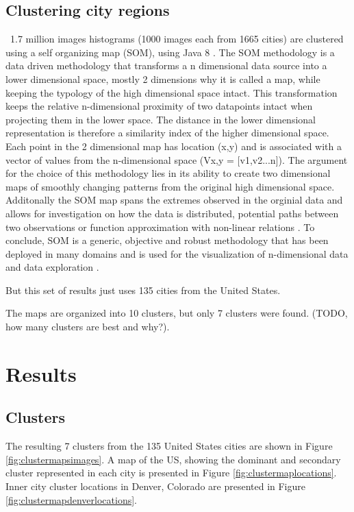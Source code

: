 \documentclass[final,3p,times,authoryear]{elsarticle}
\begin{document}
\subsection{Clustering city regions}\label{methodscluster}
~1.7 million images histograms (1000 images each from 1665 cities) are clustered using a self organizing map (SOM), using Java 8 \citep{Oracle2018}.  
The SOM methodology \citep{Kohonen1982} is a data driven methodology that transforms a n dimensional data source into a lower dimensional space, mostly 2 dimensions why it is called a map, while keeping the typology of the high dimensional space intact. This transformation keeps the relative n-dimensional proximity of two datapoints intact when projecting them in the lower space. The distance in the lower dimensional representation is therefore a similarity index of the higher dimensional space. Each point in the 2 dimensional map has location (x,y) and is associated with a vector of values from the n-dimensional space (Vx,y = [v1,v2...n]).
The argument for the choice of this methodology lies in its ability to create two dimensional maps of smoothly changing patterns from the original high dimensional space. Additonally the SOM map spans the extremes observed in the orginial data and allows for investigation on how the data is distributed, potential paths between two observations or function approximation with non-linear relations \citep{Barreto2006}. 
To conclude, SOM is a generic, objective and robust methodology that has been deployed in many domains and is used for the visualization of n-dimensional data and data exploration \citep{Koleheimen2004}.


But this set of results just uses 135 cities from the United States.

The maps are organized into 10 clusters, but only 7 clusters were found. (TODO, how many clusters are best and why?). 


\section{Results}\label{results}
\subsection{Clusters}\label{resultsclusters}

The resulting 7 clusters from the 135 United States cities are shown in Figure \ref{fig:clustermapsimages}. A map of the US, showing the dominant and secondary cluster represented in each city is presented in Figure \ref{fig:clustermaplocations}. Inner city cluster locations in Denver, Colorado are presented in Figure \ref{fig:clustermapdenverlocations}.
\end{document}
